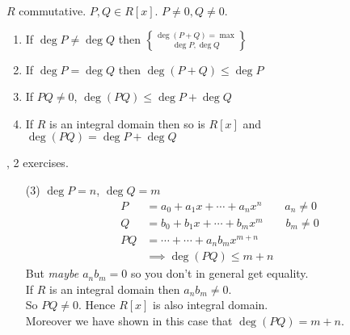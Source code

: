 \prop $R$ commutative.  $P,Q\in R[x]$.  $P\neq0,Q\neq0$.
\begin{enumerate}
\item If $\deg P\neq\deg Q$ then $\deg(P+Q)=\max\brace{\deg P,\deg Q}$
\item If $\deg P=\deg Q$ then $\deg(P+Q)\leq\deg P$
\item If $PQ\neq0$, $\deg(PQ)\leq\deg P+\deg Q$
\item If $R$ is an integral domain then so is $R[x]$ and $\deg(PQ)=\deg P + \deg Q$
\end{enumerate}
, 2 exercises.
\begin{enumerate}
\item[(3)] $\deg P=n$, $\deg Q=m$
\begin{align*}
P &= a_0 + a_1x + \dotsb + a_nx^n \qquad a_n\neq0 \\
Q &= b_0 + b_1x + \dotsb + b_mx^m \qquad b_m\neq0 \\
PQ &= \dotsb + \dotsb + a_nb_mx^{m+n} \\
&\implies \deg(PQ) \leq m+n
\end{align*}
But \emph{maybe $a_nb_m=0$} so you don't in general get equality. \\
If $R$ is an integral domain then $a_nb_m\neq0$. \\
So $PQ\neq0$.  Hence $R[x]$ is also integral domain. \\
Moreover we have shown in this case that $\deg(PQ)=m+n$.
\end{enumerate}